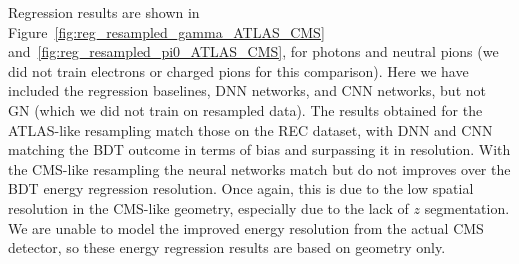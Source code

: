 Regression results are shown in Figure~\ref{fig:reg_resampled_gamma_ATLAS_CMS} and~\ref{fig:reg_resampled_pi0_ATLAS_CMS}, for photons and neutral pions (we did not train electrons or charged pions for this comparison). Here we have included the regression baselines, DNN networks, and CNN networks, but not GN (which we did not train on resampled data). The results obtained for the ATLAS-like resampling match those on the REC dataset, with DNN and CNN matching the BDT outcome in terms of bias and surpassing it in resolution. With the CMS-like resampling the neural networks match but do not improves over the BDT energy regression resolution. Once again, this is due to the low spatial resolution in the CMS-like geometry, especially due to the lack of $z$ segmentation. We are unable to model the improved energy resolution from the actual CMS detector, so these energy regression results are based on geometry only.

\begin{figure*}[htbp]
\centering
\caption{Bias (left) and resolution (right) as a function of true energy for energy predictions for photons, on variable-angle samples resampled to ATLAS-like (top) and CMS-like (bottom) geometries.\label{fig:reg_resampled_gamma_ATLAS_CMS}}
\end{figure*}

\begin{figure*}[htbp]
\centering
\caption{Bias (left) and resolution (right) as a function of true energy for energy predictions for \pizero, on variable-angle samples resampled to  ATLAS-like (top) and CMS-like (bottom) geometries.\label{fig:reg_resampled_pi0_ATLAS_CMS}}
\end{figure*}